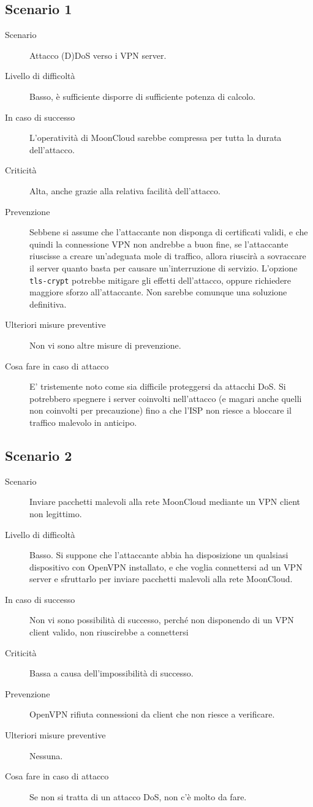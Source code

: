 
\subsection{Scenario 1}
\begin{description}
    \item[Scenario]Attacco (D)DoS verso i VPN server.
    \item[Livello di difficoltà]Basso, è sufficiente disporre
    di sufficiente potenza di calcolo. 
    \item[In caso di successo]L'operatività di MoonCloud sarebbe
    compressa per tutta la durata dell'attacco. 
    \item[Criticità]Alta, anche grazie alla relativa facilità dell'attacco.
    \item[Prevenzione]Sebbene si assume che l'attaccante non disponga di
    certificati validi, e che quindi la connessione VPN non andrebbe a buon
    fine, se l'attaccante riuscisse a creare un'adeguata mole di
    traffico, allora riuscirà a sovraccare il server quanto basta
    per causare un'interruzione di servizio.
    L'opzione \texttt{tls-crypt} potrebbe mitigare gli effetti dell'attacco,
    oppure richiedere maggiore sforzo all'attaccante. Non sarebbe
    comunque una soluzione definitiva.
    \item[Ulteriori misure preventive]Non vi sono altre misure di prevenzione. 
    \item[Cosa fare in caso di attacco]E' tristemente noto come sia
    difficile proteggersi da attacchi DoS. Si potrebbero spegnere
    i server coinvolti nell'attacco (e magari anche quelli non
    coinvolti per precauzione) fino a che l'ISP non riesce
    a bloccare il traffico malevolo in anticipo.
\end{description}


\subsection{Scenario 2}
\begin{description}
    \item[Scenario]Inviare pacchetti malevoli alla rete MoonCloud
    mediante un VPN client non legittimo.
    \item[Livello di difficoltà]Basso. Si suppone che l'attaccante abbia
    ha disposizione un qualsiasi dispositivo con OpenVPN installato, e che
    voglia connettersi ad un VPN server e sfruttarlo per inviare
    pacchetti malevoli alla rete MoonCloud.
    \item[In caso di successo]Non vi sono possibilità di successo, perché
    non disponendo di un VPN client valido, non riuscirebbe a connettersi 
    \item[Criticità]Bassa a causa dell'impossibilità di successo.
    \item[Prevenzione]OpenVPN rifiuta connessioni da client che non riesce
    a verificare. 
    \item[Ulteriori misure preventive]Nessuna.
    \item[Cosa fare in caso di attacco]Se non si tratta di un attacco DoS,
    non c'è molto da fare. 
\end{description}

